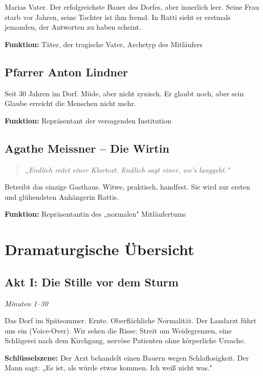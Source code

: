 \documentclass[11pt,a4paper,twoside]{book}
\begin{document}
Marias Vater. Der erfolgreichste Bauer des Dorfes, aber innerlich leer. Seine Frau starb vor Jahren, seine Tochter ist ihm fremd. In Ratti sieht er erstmals jemanden, der Antworten zu haben scheint.

\textbf{Funktion:} Täter, der tragische Vater, Archetyp des Mitläufers

\section{Pfarrer Anton Lindner}

Seit 30 Jahren im Dorf. Müde, aber nicht zynisch. Er glaubt noch, aber sein Glaube erreicht die Menschen nicht mehr.

\textbf{Funktion:} Repräsentant der versagenden Institution

\section{Agathe Meissner -- Die Wirtin}

\begin{quote}
\textit{„Endlich redet einer Klartext. Endlich sagt einer, wo's langgeht."}
\end{quote}

Betreibt das einzige Gasthaus. Witwe, praktisch, handfest. Sie wird zur ersten und glühendsten Anhängerin Rattis.

\textbf{Funktion:} Repräsentantin des „normalen" Mitläufertums


\chapter{Dramaturgische Übersicht}

\section{Akt I: Die Stille vor dem Sturm}
\textit{Minuten 1--30}

Das Dorf im Spätsommer. Ernte. Oberflächliche Normalität. Der Landarzt führt uns ein (Voice-Over). Wir sehen die Risse: Streit um Weidegrenzen, eine Schlägerei nach dem Kirchgang, nervöse Patienten ohne körperliche Ursache.

\textbf{Schlüsselszene:} Der Arzt behandelt einen Bauern wegen Schlaflosigkeit. Der Mann sagt: „Es ist, als würde etwas kommen. Ich weiß nicht was."
\end{document}
